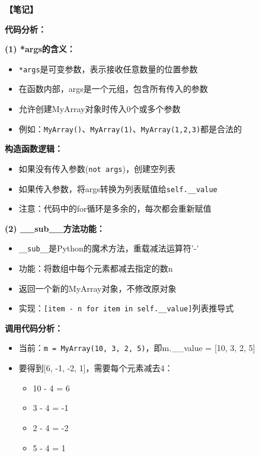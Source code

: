 \begin{mdframed}[linewidth=1pt, linecolor=black]

  \textbf{\color{red}【笔记】}

  \textbf{代码分析：}

  \textbf{(1) *args的含义：}
  \begin{itemize}
    \item \texttt{*args}是可变参数，表示接收任意数量的位置参数
    \item 在函数内部，args是一个元组，包含所有传入的参数
    \item 允许创建MyArray对象时传入0个或多个参数
    \item 例如：\texttt{MyArray()}、\texttt{MyArray(1)}、\texttt{MyArray(1,2,3)}都是合法的
  \end{itemize}

  \textbf{构造函数逻辑：}
  \begin{itemize}
    \item 如果没有传入参数(\texttt{not args})，创建空列表
    \item 如果传入参数，将args转换为列表赋值给\texttt{self.\_\_value}
    \item 注意：代码中的for循环是多余的，每次都会重新赋值
  \end{itemize}

  \textbf{(2) \_\_sub\_\_方法功能：}
  \begin{itemize}
    \item \texttt{\_\_sub\_\_}是Python的魔术方法，重载减法运算符'-'
    \item 功能：将数组中每个元素都减去指定的数n
    \item 返回一个新的MyArray对象，不修改原对象
    \item 实现：\texttt{[item - n for item in self.\_\_value]}列表推导式
  \end{itemize}

  \textbf{调用代码分析：}
  \begin{itemize}
    \item 当前：\texttt{m = MyArray(10, 3, 2, 5)}，即m.\_\_value = [10, 3, 2, 5]
    \item 要得到[6, -1, -2, 1]，需要每个元素减去4：
      \begin{itemize}
        \item 10 - 4 = 6
        \item 3 - 4 = -1
        \item 2 - 4 = -2
        \item 5 - 4 = 1
      \end{itemize}
  \end{itemize}


\end{mdframed}
